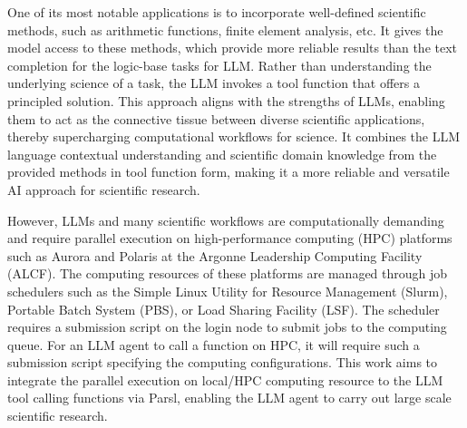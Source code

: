 One of its most notable applications is to incorporate well-defined scientific methods, such as arithmetic functions, finite element analysis, etc. 
It gives the model access to these methods, which provide more reliable results than the text completion for the logic-base tasks for LLM. 
Rather than understanding the underlying science of a task, the LLM invokes a tool function that offers a principled solution. This approach aligns with the strengths of LLMs, enabling them to act as the connective tissue between diverse scientific applications, thereby supercharging computational workflows for science.
It combines the LLM language contextual understanding and scientific domain knowledge from the provided methods in tool function form, making it a more reliable and versatile AI approach for scientific research. 


However, LLMs and many scientific workflows are computationally demanding and require parallel execution on high-performance computing (HPC) platforms such as Aurora and Polaris at the Argonne Leadership Computing Facility (ALCF). 
The computing resources of these platforms are managed through job schedulers such as the Simple Linux Utility for Resource Management (Slurm), Portable Batch System (PBS), or Load Sharing Facility (LSF). 
The scheduler requires a submission script on the login node to submit jobs to the computing queue. 
For an LLM agent to call a function on HPC, it will require such a submission script specifying the computing configurations. 
This work aims to integrate the parallel execution on local/HPC computing resource to the LLM tool calling functions via Parsl, enabling the LLM agent to carry out large scale scientific research. 



